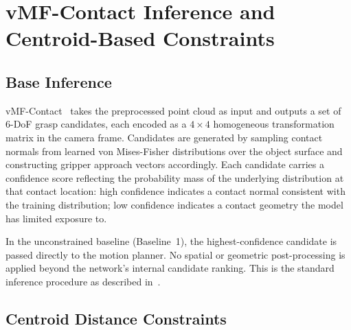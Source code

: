 \documentclass[oneside,studentpaper]{wbk}
\begin{document}
\section{vMF-Contact Inference and Centroid-Based Constraints}
\label{sec:vmf-contact-inference}

\subsection{Base Inference}
\label{sec:base-inference}

vMF-Contact~\cite{shi2025} takes the preprocessed point cloud as input and outputs a set of 6-DoF grasp candidates, each encoded as a $4\times4$ homogeneous transformation matrix in the camera frame. Candidates are generated by sampling contact normals from learned von Mises-Fisher distributions over the object surface and constructing gripper approach vectors accordingly. Each candidate carries a confidence score reflecting the probability mass of the underlying distribution at that contact location: high confidence indicates a contact normal consistent with the training distribution; low confidence indicates a contact geometry the model has limited exposure to.

In the unconstrained baseline (Baseline~1), the highest-confidence candidate is passed directly to the motion planner. No spatial or geometric post-processing is applied beyond the network's internal candidate ranking. This is the standard inference procedure as described in~\cite{shi2025}.

\subsection{Centroid Distance Constraints}
\label{sec:centroid-distance-constraints}
\end{document}
